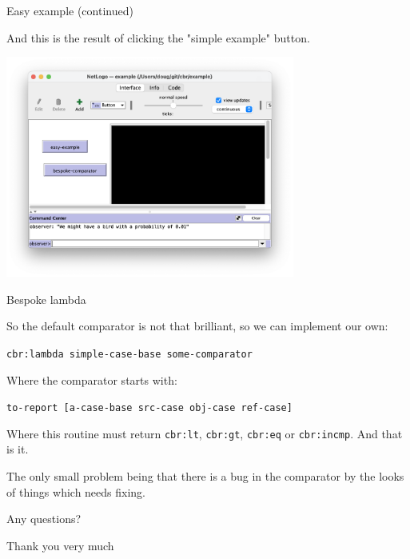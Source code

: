 \documentclass[usenames,dvipsnames,10pt]{beamer} %
\begin{document}
\begin{frame}{Easy example (continued) }

    And this is the result of clicking the "simple example" button.

    \includegraphics[width=9.5cm]{"simple-example-result.png"}

\end{frame}

\begin{frame}{Bespoke lambda}

    So the default comparator is not that brilliant, so we can implement our
    own:
    \vspace{0.5cm}

    \small
    \texttt{{\color{blue}cbr:lambda} simple-case-base some-comparator}

    \vspace{0.5cm}

    \normalsize

    Where the comparator starts with:

    \small
    \texttt{to-report [a-case-base src-case obj-case ref-case]}

    \vspace{0.5cm}

    \normalsize

    Where this routine must return \texttt{\color{blue}cbr:lt},
    \texttt{\color{blue}cbr:gt}, \texttt{\color{blue}cbr:eq} or
    \texttt{\color{blue}cbr:incmp}.  And that is it.

    \vspace{0.5cm}

    The only small problem being that there is a bug in the comparator by the
    looks of things which needs fixing.


\end{frame}

\begin{frame}

    \vspace{1cm}

    Any questions?

    \vspace{1cm}

    Thank you very much
\finalpage
\end{frame}
\end{document}

